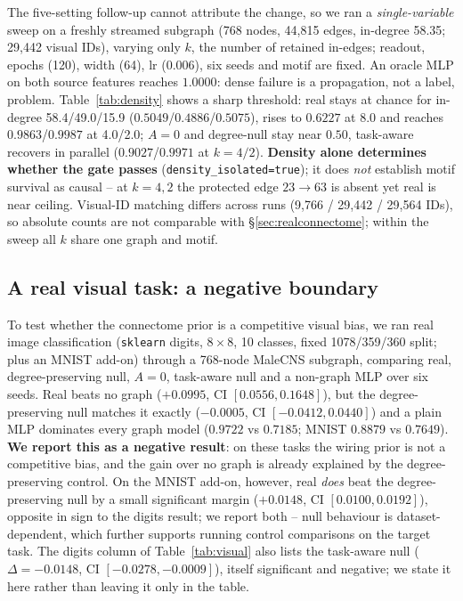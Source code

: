 \documentclass[10pt,twocolumn,letterpaper]{article}
\begin{document}
The five-setting follow-up cannot attribute the change, so we ran a
\emph{single-variable} sweep on a freshly streamed subgraph (768 nodes,
44{,}815 edges, in-degree 58.35; 29{,}442 visual IDs), varying only $k$, the
number of retained in-edges; readout, epochs (120), width (64), lr (0.006),
six seeds and motif are fixed. An oracle MLP on both source features reaches
$1.0000$: dense failure is a propagation, not a label, problem.
Table~\ref{tab:density} shows a sharp threshold: real stays at chance for
in-degree 58.4/49.0/15.9 ($0.5049$/$0.4886$/$0.5075$), rises to $0.6227$ at
8.0 and reaches $0.9863$/$0.9987$ at 4.0/2.0; $A\!=\!0$ and degree-null stay
near $0.50$, task-aware recovers in parallel ($0.9027$/$0.9971$ at
$k\!=\!4/2$). \textbf{Density alone determines whether the gate passes}
(\texttt{density\_isolated=true}); it does \emph{not} establish motif survival
as causal -- at $k\!=\!4,2$ the protected edge $23\!\to\!63$ is absent yet real
is near ceiling. Visual-ID matching differs across runs (9{,}766 / 29{,}442 /
29{,}564 IDs), so absolute counts are not comparable with
\S\ref{sec:realconnectome}; within the sweep all $k$ share one graph and motif.

\subsection{A real visual task: a negative boundary}
\label{sec:visualtask}

To test whether the connectome prior is a competitive visual bias, we ran real
image classification (\texttt{sklearn} digits, $8\times8$, 10 classes, fixed
1078/359/360 split; plus an MNIST add-on) through a 768-node MaleCNS subgraph,
comparing real, degree-preserving null, $A\!=\!0$, task-aware null and a
non-graph MLP over six seeds. Real beats no graph ($+0.0995$, CI
$[0.0556,0.1648]$), but the degree-preserving null matches it exactly
($-0.0005$, CI $[-0.0412,0.0440]$) and a plain MLP dominates every graph
model ($0.9722$ vs $0.7185$; MNIST $0.8879$ vs $0.7649$). \textbf{We report
this as a negative result}: on these tasks the wiring prior is not a
competitive bias, and the gain over no graph is already explained by the
degree-preserving control. On the MNIST add-on, however, real \emph{does} beat
the degree-preserving null by a small significant margin ($+0.0148$, CI
$[0.0100,0.0192]$), opposite in sign to the digits result; we report both --
null behaviour is dataset-dependent, which further supports running control
comparisons on the target task. The digits column of Table~\ref{tab:visual}
also lists the task-aware null ($\Delta=-0.0148$, CI $[-0.0278,-0.0009]$),
itself significant and negative; we state it here rather than leaving it only
in the table.
\end{document}
